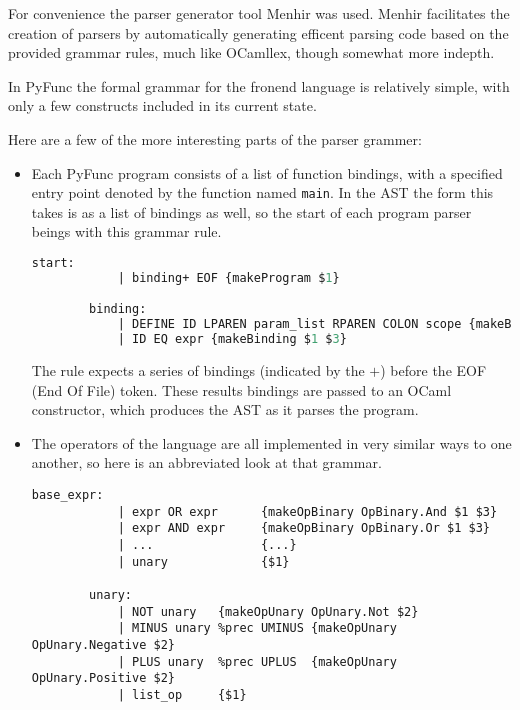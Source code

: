 \documentclass{l4proj}
\begin{document}
For convenience the parser generator tool Menhir was used.
Menhir facilitates the creation of parsers by automatically generating efficent parsing code based on the provided grammar rules, much like OCamllex, though somewhat more indepth.

In PyFunc the formal grammar for the fronend language is relatively simple, with only a few constructs included in its current state.

Here are a few of the more interesting parts of the parser grammer:
\begin{itemize}
    \item
    Each PyFunc program consists of a list of function bindings, with a specified entry point denoted by the function named \texttt{main}.
    In the AST the form this takes is as a list of bindings as well, so the start of each program parser beings with this grammar rule.

    \begin{lstlisting}[language=Caml, caption=PyFunc Parser's starting rule grammar.]
        start:
            | binding+ EOF {makeProgram $1}

        binding:
            | DEFINE ID LPAREN param_list RPAREN COLON scope {makeBinding $2 (makeFunc $2 $4 $7)}
            | ID EQ expr {makeBinding $1 $3}

    \end{lstlisting}

    The rule expects a series of bindings (indicated by the $+$) before the EOF (End Of File) token.
    These results bindings are passed to an OCaml constructor, which produces the AST as it parses the program.

    \item 
    The operators of the language are all implemented in very similar ways to one another, so here is an abbreviated look at that grammar.
    \begin{lstlisting}[caption=An abrreviated version of PyFunc Parser's implementation of binary and unary operators.]
        base_expr:
            | expr OR expr      {makeOpBinary OpBinary.And $1 $3}
            | expr AND expr     {makeOpBinary OpBinary.Or $1 $3}
            | ...               {...}
            | unary             {$1}

        unary:
            | NOT unary   {makeOpUnary OpUnary.Not $2}
            | MINUS unary %prec UMINUS {makeOpUnary OpUnary.Negative $2}
            | PLUS unary  %prec UPLUS  {makeOpUnary OpUnary.Positive $2}
            | list_op     {$1}
    \end{lstlisting}


\end{itemize}
\end{document}
